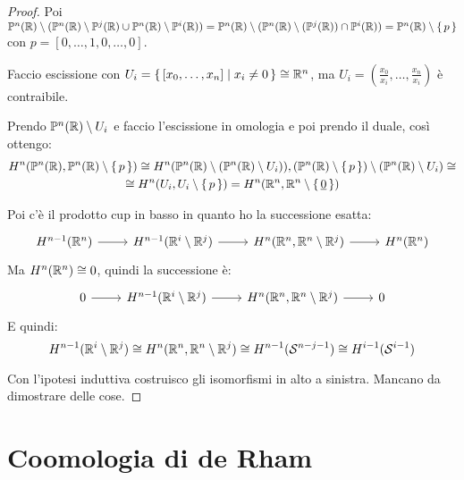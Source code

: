 \begin{proof}
  Poi $ \mathbb{P}^n (\mathbb{R}) \setminus (\mathbb{P}^n (\mathbb{R}) \setminus \mathbb{P}^j (\mathbb{R}) \cup \mathbb{P}^n (\mathbb{R}) \setminus \mathbb{P}^i (\mathbb{R})) = \mathbb{P}^n (\mathbb{R}) \setminus (\mathbb{P}^n (\mathbb{R}) \setminus (\mathbb{P}^j (\mathbb{R})) \cap \mathbb{P}^i (\mathbb{R})) = \mathbb{P}^n (\mathbb{R}) \setminus \set{p} $
  con $ p = [0,\dots,1,0,\dots,0] $.

  Faccio escissione con $ U_i = \set{[x_0, \dots, x_n] | x_i \not = 0} \cong \mathbb{R}^{n} $,
  ma $ U_i = \left(\frac{x_0}{x_i}, \dots, \frac{x_n}{x_i} \right) $ è contraibile.

  Prendo $ \mathbb{P}^n (\mathbb{R}) \setminus U_i $ e faccio l'escissione in omologia e poi prendo il duale, così
  ottengo:
  \begin{gather*}
    H^n(\mathbb{P}^n (\mathbb{R}), \mathbb{P}^n (\mathbb{R}) \setminus \set{p}) \cong H^n(\mathbb{P}^n (\mathbb{R}) \setminus (\mathbb{P}^n (\mathbb{R}) \setminus U_i)), (\mathbb{P}^n (\mathbb{R}) \setminus \set{p}) \setminus (\mathbb{P}^n (\mathbb{R}) \setminus U_i) \cong \\
    \cong H^n(U_i, U_i \setminus \set{p}) = H^n(\mathbb{R}^{n}, \mathbb{R}^{n} \setminus \set{\underline{0}})
  \end{gather*}

  Poi c'è il prodotto cup in basso in quanto ho la successione esatta:
  \[
    \begin{tikzcd}
      H^{n-1}(\RN{n}) \rar & H^{n-1}(\RN{i} \setminus \RN{j}) \rar & H^n(\RN{n}, \RN{n} \setminus \RN{j}) \rar & H^n(\RN{n})
    \end{tikzcd}
  \]
  Ma $ H^n(\mathbb{R}^{n}) \cong 0 $, quindi la successione è:
  \[
    \begin{tikzcd}
      0 \rar & H^{n-1}(\RN{i} \setminus \RN{j}) \rar & H^n(\RN{n}, \RN{n} \setminus \RN{j}) \rar & 0
    \end{tikzcd}
  \]
  E quindi:
  \[
     H^{n-1}(\mathbb{R}^{i} \setminus \mathbb{R}^{j}) \cong  H^n(\mathbb{R}^{n}, \mathbb{R}^{n} \setminus \mathbb{R}^{j}) \cong H^{n-1}(\mathcal{S}^{n-j-1}) \cong H^{i-1}(\mathcal{S}^{i-1})
  \]

  Con l'ipotesi induttiva costruisco gli isomorfismi in alto a sinistra.
  Mancano da dimostrare delle cose.

\end{proof}

\section{Coomologia di de Rham}

